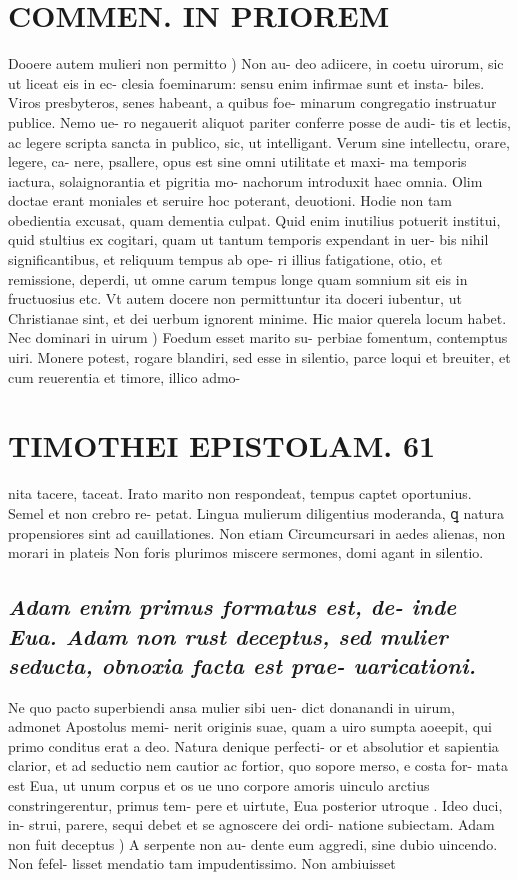 \documentclass{article}
\begin{document}
\begin{pages}
\section*{COMMEN. IN PRIOREM }
\marginpar{[ p.61 ]}\pstart Dooere autem mulieri non permitto ) Non au- deo adiicere, in coetu uirorum, sic ut liceat eis in ec- clesia foeminarum: sensu enim infirmae sunt et insta- biles. Viros presbyteros, senes habeant, a quibus foe- minarum congregatio instruatur publice. Nemo ue- ro negauerit aliquot pariter conferre posse de audi- tis et lectis, ac legere scripta sancta in publico, sic, ut intelligant. Verum sine intellectu, orare, legere, ca- nere, psallere, opus est sine omni utilitate et maxi- ma temporis iactura, solaignorantia et pigritia mo- nachorum introduxit haec omnia. Olim doctae erant moniales et seruire hoc poterant, deuotioni. Hodie non tam obedientia excusat, quam dementia culpat. Quid enim inutilius potuerit institui, quid stultius ex cogitari, quam ut tantum temporis expendant in uer- bis nihil significantibus, et reliquum tempus ab ope- ri illius fatigatione, otio, et remissione, deperdi, ut omne carum tempus longe quam somnium sit eis in fructuosius etc. Vt autem docere non permittuntur ita doceri iubentur, ut Christianae sint, et dei uerbum ignorent minime. Hic maior querela locum habet.  \pend\pstart Nec dominari in uirum ) Foedum esset marito su- perbiae fomentum, contemptus uiri. Monere potest, rogare blandiri, sed esse in silentio, parce loqui et breuiter, et cum reuerentia et timore, illico admo-  \pend
\section*{TIMOTHEI EPISTOLAM. 61 }\pstart nita tacere, taceat. Irato marito non respondeat, tempus captet oportunius. Semel et non crebro re- petat. Lingua mulierum diligentius moderanda, ꝗ natura propensiores sint ad cauillationes. Non etiam Circumcursari in aedes alienas, non morari in plateis Non foris plurimos miscere sermones, domi agant in silentio.  \pend
{}
{}
\subsection*{\textit{Adam enim primus formatus est, de- inde Eua. Adam non rust deceptus, sed mulier seducta, obnoxia facta est prae- uaricationi. }}\pstart Ne quo pacto superbiendi ansa mulier sibi uen- dict donanandi in uirum, admonet Apostolus memi- nerit originis suae, quam a uiro sumpta aoeepit, qui primo conditus erat a deo. Natura denique perfecti- or et absolutior et sapientia clarior, et ad seductio nem cautior ac fortior, quo sopore merso, e costa for- mata est Eua, ut unum corpus et os ue uno corpore amoris uinculo arctius constringerentur, primus tem- pere et uirtute, Eua posterior utroque . Ideo duci, in- strui, parere, sequi debet et se agnoscere dei ordi- natione subiectam.  \pend\pstart Adam non fuit deceptus ) A serpente non au- dente eum aggredi, sine dubio uincendo. Non fefel- lisset mendatio tam impudentissimo. Non ambiuisset  \pend

\end{pages}
\end{document}
